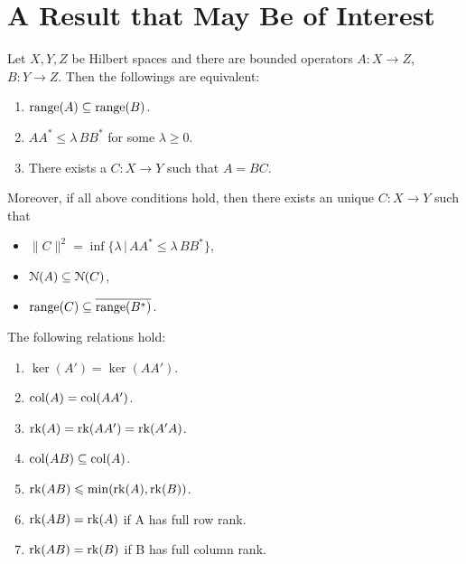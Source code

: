 \section{A Result that May Be of Interest}

\begin{prp}
  Let $X, Y, Z$ be Hilbert spaces and there are bounded operators $A:X\rightarrow Z$, $B:Y\rightarrow Z$. Then the followings are equivalent:
  \begin{enumerate}
    \item $\operatorname{range}(A)\subseteq\operatorname{range}(B)$.
    \item $AA^*\leqslant\lambda\,BB^*$ for some $\lambda\geqslant 0$.
    \item There exists a $C: X\rightarrow Y$ such that $A=BC$.
  \end{enumerate}
  Moreover, if all above conditions hold, then there exists an unique $C: X\rightarrow Y$ such that
  \begin{itemize}
    \item $\|C\|^2 = \inf\{\lambda\,|\,AA^*\leqslant\lambda\,BB^*\}$,
    \item $\operatorname{\EuScript{N}}(A)\subseteq\operatorname{\EuScript{N}}(C)$,
    \item $\operatorname{range}(C)\subseteq\overline{\operatorname{range}(B^*)}$.
  \end{itemize}
\end{prp}

\begin{lmm}\label{lmm:0} 
  The following relations hold:
  \begin{enumerate}
    \item $\ker(A') = \ker(AA')$.
    \item $\operatorname{col}(A) = \operatorname{col}(AA')$.
    \item\label{it:1} $\operatorname{rk}(A) = \operatorname{rk}(AA') = \operatorname{rk}(A'A)$.
    \item $\operatorname{col}(AB)\subseteq\operatorname{col}(A)$.
    \item $\operatorname{rk}(AB)\leqslant\min(\operatorname{rk}(A), \operatorname{rk}(B))$.
    \item $\operatorname{rk}(AB) = \operatorname{rk}(A)$ if A has full row rank.
    \item\label{it:0} $\operatorname{rk}(AB) = \operatorname{rk}(B)$ if B has full column rank.
  \end{enumerate}
\end{lmm}

%
%      

